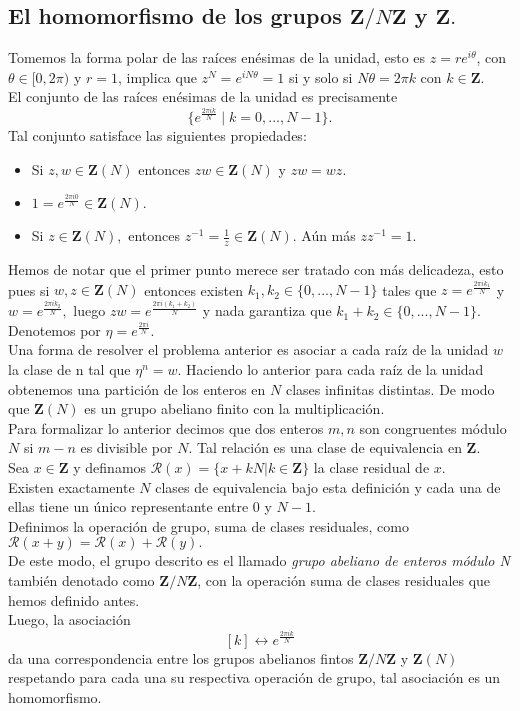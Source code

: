 \documentclass[a4paper,openright,10pt]{article}
\begin{document}
\subsection{El homomorfismo de los grupos $\mathbf{Z}/N\mathbf{Z}$ y $\mathbf{Z}.$}
Tomemos la forma polar de las ra\'ices en\'esimas de la unidad, esto es $z=re^{i \theta}$, con $\theta \in [0, 2\pi)$ y $r=1$, implica que $z^{N}=e^{iN \theta}=1$ si y solo si $N \theta = 2\pi k$ con $k \in \mathbf{Z}$.\\
El conjunto de las ra\'ices en\'esimas de la unidad es precisamente
$$
\{e^{\frac{2\pi ik}{N}} \mid k=0,...,N-1 \}
.$$
Tal conjunto satisface las siguientes propiedades:
\begin{itemize}
    \item Si $z, w \in \mathbf{Z}(N)$ entonces $zw \in \mathbf{Z}(N)$ y $zw=wz.$ 
    \item $1=e^{\frac{2\pi i0}{N}} \in \mathbf{Z}(N).$
    \item Si $z \in \mathbf{Z}(N),$ entonces $z^{-1}=\frac{1}{z} \in \mathbf{Z}(N).$ A\'un m\'as $zz^{-1}=1.$
\end{itemize}
Hemos de notar que el primer punto merece ser tratado con m\'as delicadeza, esto pues si $w,z \in \mathbf{Z}(N)$ entonces existen $k_{1}, k_{2} \in \{0,...,N-1\}$ tales que $z=e^{\frac{2\pi ik_{1}}{N}}$ y $w=e^{\frac{2\pi ik_{2}}{N}},$ luego $zw=e^{\frac{2\pi i(k_{1}+k_{2})}{N}}$ y nada garantiza que $k_{1}+k_{2} \in \{0,...,N-1\}.$\\
Denotemos por $\eta=e^{\frac{2\pi i}{N}}.$ \\
Una forma de resolver el problema anterior es asociar a cada ra\'iz de la unidad $w$ la clase de n tal que $\eta ^{n}=w.$ Haciendo lo anterior para cada ra\'iz de la unidad obtenemos una partici\'on de los enteros en $N$ clases infinitas distintas. De modo que $\mathbf{Z}(N)$ es un grupo abeliano finito con la multiplicaci\'on.\\
Para formalizar lo anterior decimos que dos enteros $m,n$ son congruentes m\'odulo $N$ si $m-n$ es divisible por $N.$ Tal relaci\'on es una clase de equivalencia en $\mathbf{Z}$.\\
Sea $x\in \mathbf{Z}$ y definamos $\mathcal{R}(x) = \{x+kN | k\in \mathbf{Z}\}$ la clase residual de $x.$\\ Existen exactamente $N$ clases de equivalencia bajo esta definici\'on y cada una de ellas tiene un \'unico representante entre $0$ y $N-1.$ \\
Definimos la operaci\'on de grupo, suma de clases residuales, como $\mathcal{R}(x+y)=\mathcal{R}(x)+\mathcal{R}(y).$\\
De este modo, el grupo descrito es el llamado \textit{grupo abeliano de enteros m\'odulo N} tambi\'en denotado como $\mathbf{Z}/N\mathbf{Z}$, con la operaci\'on suma de clases residuales que hemos definido antes.\\
Luego, la asociaci\'on $$
[k] \leftrightarrow e^{\frac{2\pi ik}{N}}
$$ da una correspondencia entre los grupos abelianos fintos $\mathbf{Z}/N\mathbf{Z}$ y $\mathbf{Z}(N)$ respetando para cada una su respectiva operaci\'on de grupo, tal asociaci\'on es un homomorfismo.\\
\end{document}
